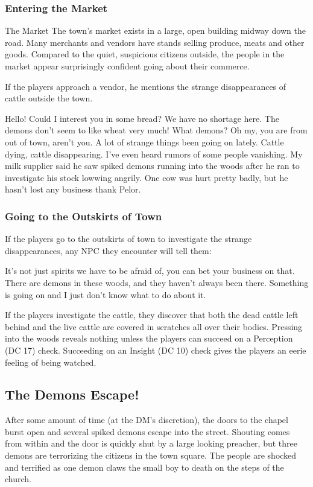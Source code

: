\documentclass[10pt,twoside,twocolumn]{article}
\begin{document}
\subsubsection{Entering the Market}
\begin{paperbox}{The Market}
    The town's market exists in a large, open building midway down the road.  Many merchants and vendors have stands selling produce, meats and other goods.  Compared to the quiet, suspicious citizens outside, the people in the market appear surprisingly confident going about their commerce.
\end{paperbox}
If the players approach a vendor, he mentions the strange disappearances of cattle outside the town.
\begin{quotebox}
    Hello!  Could I interest you in some bread?  We have no shortage here.  The demons don't seem to like wheat very much!  What demons?  Oh my, you are from out of town, aren't you.  A lot of strange things been going on lately.  Cattle dying, cattle disappearing.  I've even heard rumors of some people vanishing.  My milk supplier said he saw spiked demons running into the woods after he ran to investigate his stock lowwing angrily.  One cow was hurt pretty badly, but he hasn't lost any business thank Pelor.
\end{quotebox}

\subsubsection{Going to the Outskirts of Town}
If the players go to the outskirts of town to investigate the strange disappearances, any NPC they encounter will tell them:
\begin{quotebox}
    It's not just spirits we have to be afraid of, you can bet your business on that.  There are demons in these woods, and they haven't always been there.  Something is going on and I just don't know what to do about it.
\end{quotebox}

If the players investigate the cattle, they discover that both the dead cattle left behind and the live cattle are covered in scratches all over their bodies.  Pressing into the woods reveals nothing unless the players can succeed on a Perception (DC 17) check.  Succeeding on an Insight (DC 10) check gives the players an eerie feeling of being watched.

\newpage

\subsection{The Demons Escape!}
After some amount of time (at the DM's discretion), the doors to the chapel burst open and several spiked demons escape into the street.  Shouting comes from within and the door is quickly shut by a large looking preacher, but three demons are terrorizing the citizens in the town square.  The people are shocked and terrified as one demon claws the small boy to death on the steps of the church.
\end{document}
